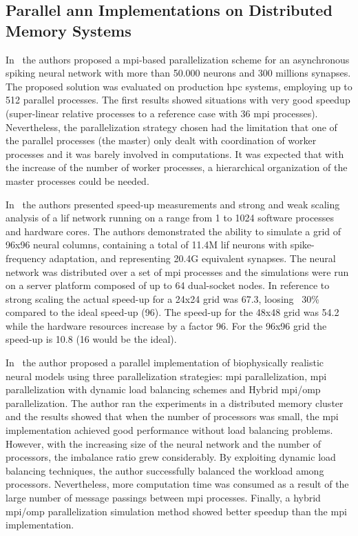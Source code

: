 {\subsection{Parallel \gls{ann} Implementations on Distributed Memory Systems}

In~\cite{6821186} the authors proposed a \gls{mpi}-based parallelization scheme for an asynchronous spiking neural network with more than 50.000 neurons and 300 millions synapses. The proposed solution was evaluated on production \gls{hpc} systems, employing up to 512 parallel processes. The first results showed situations with very good speedup (super-linear relative processes to a reference case with 36 \gls{mpi} processes). Nevertheless, the parallelization strategy chosen had the limitation that one of the parallel processes (the master) only dealt with coordination of worker processes and it was barely involved in computations. It was expected that with the increase of the number of worker processes, a hierarchical organization of the master processes could be needed.

In~\cite{Pastorelli2015ScalingT1} the authors presented speed-up measurements and strong and weak scaling analysis of a \gls{lif} network running on a range from 1 to 1024 software processes and hardware cores. The authors demonstrated the ability to simulate a grid of 96x96 neural columns, containing a total of 11.4M \gls{lif} neurons with spike-frequency adaptation, and representing 20.4G equivalent synapses. The neural network was distributed over a set of \gls{mpi} processes and the simulations were run on a server platform composed of up to 64 dual-socket nodes. In reference to strong scaling the actual speed-up for a 24x24 grid was 67.3, loosing ~30\% compared to the ideal speed-up (96). The speed-up for the 48x48 grid was 54.2 while the hardware resources increase by a factor 96. For the 96x96 grid the speed-up is 10.8 (16 would be the ideal).

In~\cite{hu2012biophysically} the author proposed a parallel implementation of biophysically realistic neural models using three parallelization strategies: \gls{mpi} parallelization, \gls{mpi} parallelization with dynamic load balancing schemes and Hybrid \gls{mpi}/\gls{omp} parallelization. The author ran the experiments in a distributed memory cluster and the results showed that when the number of processors was small, the \gls{mpi} implementation achieved good performance without load balancing problems. However, with the increasing size of the neural network and the number of processors, the imbalance ratio grew considerably. By exploiting dynamic load balancing techniques, the author successfully balanced the workload among processors. Nevertheless, more computation time was consumed as a result of the large number of message passings between \gls{mpi} processes. Finally, a hybrid \gls{mpi}/\gls{omp} parallelization simulation method showed better speedup than the \gls{mpi} implementation.
}














